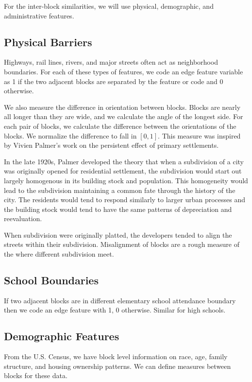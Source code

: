 \documentclass[12pt,letter]{article}\usepackage[]{graphicx}\usepackage[]{color}
\begin{document}
For the inter-block similarities, we will use physical, demographic, and
administrative features.

\subsection*{Physical Barriers}
Highways, rail lines, rivers, and major streets often act as neighborhood
boundaries. For each of these types of features, we code an edge feature
variable as 1 if the two adjacent blocks are separated by the feature or code
and 0 otherwise.

We also measure the difference in orientation between blocks. Blocks
are nearly all longer than they are wide, and we calculate the angle
of the longest side. For each pair of blocks, we calculate the
difference between the orientations of the blocks. We normalize the
difference to fall in $[0, 1]$. This measure was inspired by Vivien
Palmer's work on the persistent effect of primary settlements. 

In the late 1920s, Palmer developed the theory that when a subdivision
of a city was originally opened for residential settlement, the
subdivision would start out largely homogenous in its building stock
and population. This homogeneity would lead to the subdivision
maintaining a common fate through the history of the city. The
residents would tend to respond similarly to larger urban processes
and the building stock would tend to have the same patterns of
depreciation and reevaluation.\cite{palmer_primary_1932}

When subdivision were originally platted, the developers tended to
align the streets within their subdivision. Misalignment of blocks are
a rough measure of the where different subdivision meet. 

\subsection*{School Boundaries}
If two adjacent blocks are in different elementary school attendance boundary
then we code an edge feature with 1, 0 otherwise. Similar for high schools.

\subsection*{Demographic Features}
From the U.S. Census, we have block level information on race, age, family
structure, and housing ownership patterns. We can define measures between
blocks for these data.
\end{document}
